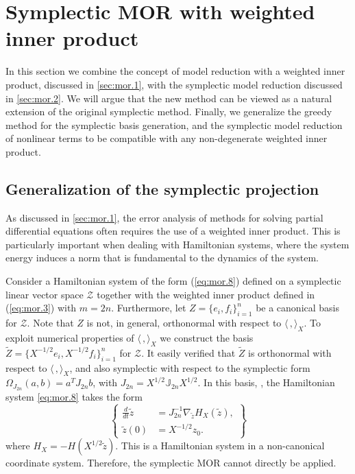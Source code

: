 \section{Symplectic MOR with weighted inner product} \label{sec:normmor}

In this section we combine the concept of model reduction with a weighted inner product, discussed in \cref{sec:mor.1}, with the symplectic model reduction discussed in \cref{sec:mor.2}. We will argue that the new method can be viewed as a natural extension of the original symplectic method. Finally, we generalize the greedy method for the symplectic basis generation, and the symplectic model reduction of nonlinear terms to be compatible with any non-degenerate weighted inner product.

\subsection{Generalization of the symplectic projection} \label{sec:normmor.1}
As discussed in \cref{sec:mor.1}, the error analysis of methods for solving partial differential equations often requires the use of a weighted inner product. This is particularly important when dealing with Hamiltonian systems, where the system energy induces a norm that is fundamental to the dynamics of the system.
   
Consider a Hamiltonian system of the form (\ref{eq:mor.8}) defined on a symplectic linear vector space $\mathcal Z$ together with the weighted inner product defined in (\ref{eq:mor.3}) with $m=2n$. Furthermore, let $Z = \{ e_i,f_i \}_{i=1}^n$ be a canonical  basis for $\mathcal Z$. Note that $Z$ is not, in general, orthonormal with respect to $\langle\,,\rangle_X$. To exploit numerical properties of $\langle\,,\rangle_X$ we construct the basis $\tilde Z = \{ X^{-1/2}e_i,X^{-1/2}f_i \}_{i=1}^{n}$ for $\mathcal Z$. It easily verified that $\tilde Z$ is orthonormal with respect to $\langle\,,\rangle_X$, and also symplectic with respect to the symplectic form $\Omega_{J_{2n}}(a,b) = a^T J_{2n} b $, with $J_{2n} = X^{1/2} \mathbb J_{2n}X^{1/2}$. In this basis, , the Hamiltonian system \eqref{eq:mor.8} takes the form
\begin{equation} \label{p1.eq:nommor.0.1}
	\left\{
	\begin{aligned}
		\frac d {dt} \tilde z &= J^{-1}_{2n} \nabla_{\tilde z} H_X(\tilde{z}), \\
		\tilde z(0) &= X^{-1/2}z_0.
	\end{aligned}
	\right\}
\end{equation}
where $H_X = -H(X^{1/2}\tilde z)$. This is a Hamiltonian system in a non-canonical coordinate system. Therefore, the symplectic MOR cannot directly be applied.


